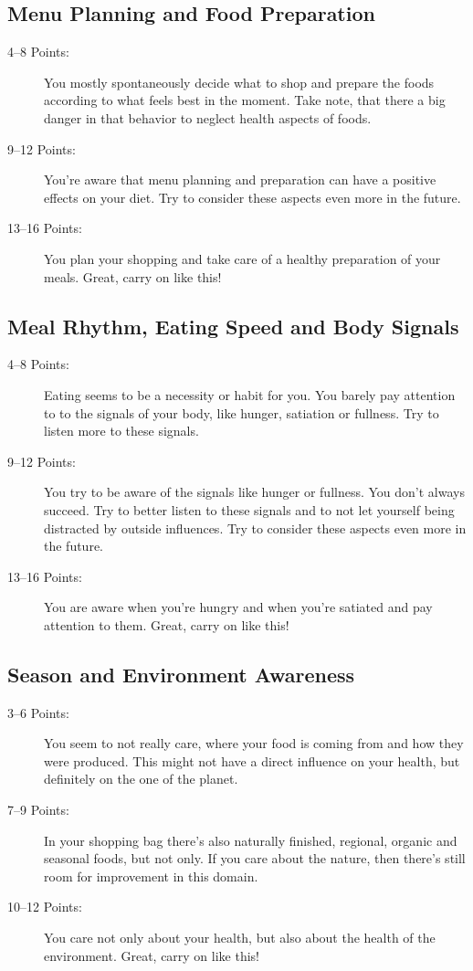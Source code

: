 \documentclass[../main.tex]{subfiles}
\begin{document}
\subsection{Menu Planning and Food Preparation}

\begin{description}
\item[4--8 Points:]  You mostly spontaneously decide what to shop and prepare the foods according to what feels best in the moment.
Take note, that there a big danger in that behavior to neglect health aspects of foods.
\item[9--12 Points:] You're aware that menu planning and preparation can have a positive effects on your diet.
  Try to consider these aspects even more in the future.
\item[13--16 Points:] You plan your shopping and take care of a healthy preparation of your meals.
  Great, carry on like this!
\end{description}


\subsection{Meal Rhythm, Eating Speed and Body Signals}

\begin{description}
\item[4--8 Points:]  Eating seems to be a necessity or habit for you.
  You barely pay attention to to the signals of your body, like hunger, satiation or fullness. Try to listen more to these signals.
\item[9--12 Points:] You try to be aware of the signals like hunger or fullness.
  You don't always succeed.
  Try to better listen to these signals and to not let yourself being distracted by outside influences.
  Try to consider these aspects even more in the future.
\item[13--16 Points:] You are aware when you're hungry and when you're satiated and pay attention to them.
  Great, carry on like this!
\end{description}


\subsection{Season and Environment Awareness}

\begin{description}
\item[3--6 Points:]  You seem to not really care, where your food is coming from and how they were produced.
  This might not have a direct influence on your health, but definitely on the one of the planet.
\item[7--9 Points:] In your shopping bag there's also naturally finished, regional, organic and seasonal foods, but not only.
  If you care about the nature, then there's still room for improvement in this domain.
\item[10--12 Points:] You care not only about your health, but also about the health of the environment.
  Great, carry on like this!
\end{description}
\end{document}

